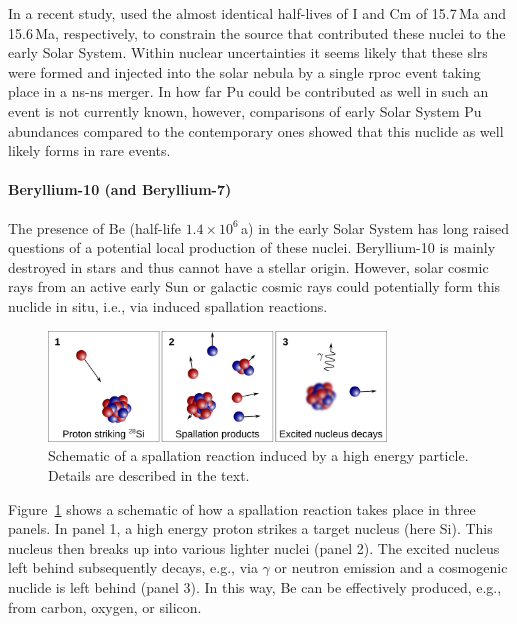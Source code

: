 In a recent study, \citet{cote21} used the almost identical half-lives of I and Cm of 15.7\,Ma and 15.6\,Ma, respectively, to constrain the source that contributed these nuclei to the early Solar System. Within nuclear uncertainties it seems likely that these \acp{slr} were formed and injected into the solar nebula by a single \ac{rproc} event taking place in a \ac{ns}-\ac{ns} merger. In how far Pu could be contributed as well in such an event is not currently known, however, comparisons of early Solar System Pu abundances compared to the contemporary ones \citep{wallner15} showed that this nuclide as well likely forms in rare events. 


\paragraph{Beryllium-10 (and Beryllium-7)}

The presence of Be (half-life $1.4\times10^{6}$\,a) in the early Solar System has long raised questions of a potential local production of these nuclei. Beryllium-10 is mainly destroyed in stars and thus cannot have a stellar origin. However, solar cosmic rays from an active early Sun or galactic cosmic rays could potentially form this nuclide in situ, i.e., via induced spallation reactions.

\begin{figure}[tb]
    \centering
    \includegraphics[width=0.8\textwidth]{graphics/solar_system_slrs/spallation}
    \caption{Schematic of a spallation reaction induced by a high energy particle. Details are described in the text.}
    \label{fig:solar_system_slrs:spallation_schematic}
\end{figure}
Figure~\ref{fig:solar_system_slrs:spallation_schematic} shows a schematic of how a spallation reaction takes place in three panels. In panel 1, a high energy proton strikes a target nucleus (here Si). This nucleus then breaks up into various lighter nuclei (panel 2). The excited nucleus left behind subsequently decays, e.g., via $\gamma$ or neutron emission and a cosmogenic nuclide is left behind (panel 3). In this way, Be can be effectively produced, e.g., from carbon, oxygen, or silicon. 

